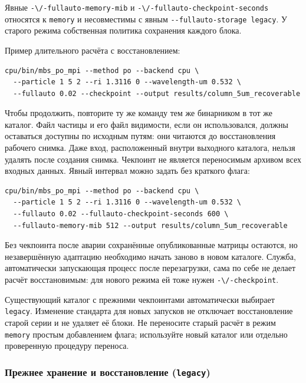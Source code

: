 Явные \nolinkurl{-\/-fullauto-memory-mib} и
\nolinkurl{-\/-fullauto-checkpoint-seconds} относятся к \texttt{memory} и
несовместимы с явным \texttt{-\/-fullauto-storage\ legacy}. У старого
режима собственная политика сохранения каждого блока.

Пример длительного расчёта с восстановлением:

\noindent\begin{minipage}{\linewidth}
\begin{verbatim}
cpu/bin/mbs_po_mpi --method po --backend cpu \
  --particle 1 5 2 --ri 1.3116 0 --wavelength-um 0.532 \
  --fullauto 0.02 --checkpoint --output results/column_5um_recoverable
\end{verbatim}
\end{minipage}

Чтобы продолжить, повторите ту же команду тем же бинарником в тот же
каталог. Файл частицы и его файл видимости, если он использовался,
должны оставаться доступны по исходным путям: они читаются до
восстановления рабочего снимка. Даже вход, расположенный внутри
выходного каталога, нельзя удалять после создания снимка. Чекпоинт не
является переносимым архивом всех входных данных. Явный интервал можно
задать без краткого флага:

\noindent\begin{minipage}{\linewidth}
\begin{verbatim}
cpu/bin/mbs_po_mpi --method po --backend cpu \
  --particle 1 5 2 --ri 1.3116 0 --wavelength-um 0.532 \
  --fullauto 0.02 --fullauto-checkpoint-seconds 600 \
  --fullauto-memory-mib 512 --output results/column_5um_recoverable
\end{verbatim}
\end{minipage}

Без чекпоинта после аварии сохранённые опубликованные матрицы остаются,
но незавершённую адаптацию необходимо начать заново в новом каталоге.
Служба, автоматически запускающая процесс после перезагрузки, сама по
себе не делает расчёт восстановимым: для нового режима ей тоже нужен
\nolinkurl{-\/-checkpoint}.

Существующий каталог с прежними чекпоинтами автоматически выбирает
\texttt{legacy}. Изменение стандарта для новых запусков не отключает
восстановление старой серии и не удаляет её блоки. Не переносите старый
расчёт в режим \texttt{memory} простым добавлением флага; используйте
новый каталог или отдельно проверенную процедуру переноса.

\subsubsection{\texorpdfstring{Прежнее хранение и восстановление
(\texttt{legacy})}{Прежнее хранение и восстановление (legacy)}}\label{ux43fux440ux435ux436ux43dux435ux435-ux445ux440ux430ux43dux435ux43dux438ux435-ux438-ux432ux43eux441ux441ux442ux430ux43dux43eux432ux43bux435ux43dux438ux435-legacy}

